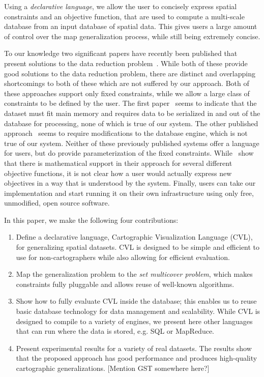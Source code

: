 Using a \emph{declarative language}, we allow the user to concisely express spatial constraints and an objective function, that are used to compute a multi-scale database from an input database of spatial data. This gives users a large amount of control over the map generalization process, while still being extremely concise.

To our knowledge two significant papers have recently been published that present solutions to the data reduction problem~\cite{nutanong2012multiresolution,sarma2012fusiontables}. While both of these provide good solutions to the data reduction problem, there are distinct and overlapping shortcomings to both of these which are not suffered by our approach.  Both of these approaches support only fixed constraints, while we allow a large class of constraints to be defined by the user. The first paper~\cite{sarma2012fusiontables} seems to indicate that the dataset must fit main memory and requires data to be serialized in and out of the database for processing, none of which is true of our system. The other published approach~\cite{nutanong2012multiresolution} seems to require modifications to the database engine, which is not true of our system. Neither of these previously published systems offer a language for users, but do provide parameterization of the fixed constraints. While~\cite{sarma2012fusiontables} show that there is mathematical support in their approach for several different objective functions, it is not clear how a user would actually express new objectives in a way that is understood by the system. Finally, users can take our implementation and start running it on their own infrastructure using only free, unmodified, open source software.

In this paper, we make the following four contributions:
\begin{enumerate}
\item Define a declarative language, Cartographic Visualization Language (CVL), for generalizing spatial datasets. CVL is designed to be simple and efficient to use for non-cartographers while also allowing for efficient evaluation.

\item Map the generalization problem to the \emph{set multicover problem}, which makes constraints fully pluggable and allows reuse of well-known algorithms.

\item Show how to fully evaluate CVL inside the database; this enables us to reuse basic database technology for data management and scalability. While CVL is designed to compile to a variety of engines, we present here other languages that can run where the data is stored, e.g. SQL or MapReduce.

\item Present experimental results for a variety of real datasets. The results show that the proposed approach has good performance and produces high-quality cartographic generalizations. [Mention GST somewhere here?] 
\end{enumerate}

